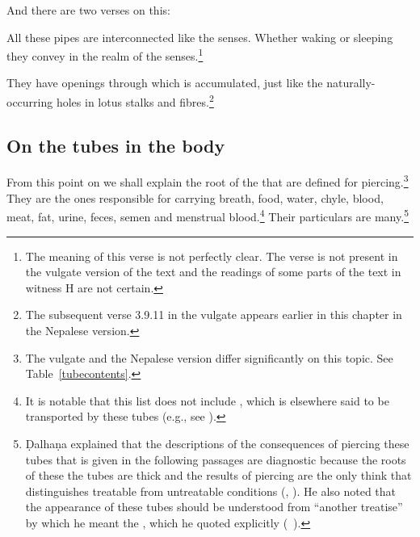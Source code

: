 \begin{refsection}
\begin{translation}
\item[9.add]

And there are two verses on this:
\begin{sloka}
    All these pipes are interconnected like the senses. Whether waking
or sleeping they convey in the realm of the senses.\footnote{The
    meaning of this verse is not perfectly clear.  The verse is not
    present in the vulgate version of the text and the readings of
    some parts of the text in witness H are not certain.}
\end{sloka}


\item[10]

\begin{sloka}
They have openings through which  is accumulated, just like
the naturally-occurring holes in lotus stalks and fibres.\footnote{The 
subsequent verse 3.9.11 in the vulgate appears earlier in this chapter in the 
Nepalese 
version.} 
\end{sloka}


\subsection{On the tubes in the body}
\item[12]

From this point on we shall explain the root of the
 that are defined for piercing.\footnote{The
    vulgate and the Nepalese version differ significantly on this topic.
    See Table~\ref{tubecontents}.}  They are the ones responsible for
    carrying breath, food, water, chyle, blood, meat, fat, urine, feces,
    semen and menstrual blood.\footnote{It is notable that this list does not 
    include , which is elsewhere said to be transported by 
    these tubes (e.g., see \pageref{sanjnavahasrotas}).}  Their particulars are
    many.\footnote{Ḍalhaṇa explained that the descriptions of the
        consequences of piercing these tubes that is given in the following
        passages are diagnostic because the roots of these the tubes are thick
        and the results of piercing are the only think that distinguishes
        treatable from untreatable conditions (, ).  He also noted that the appearance 
        of these tubes should be understood from “another treatise” by which he 
        meant the \CS, which he quoted explicitly (\CS\ ).}
    

\end{translation}
\end{refsection}
